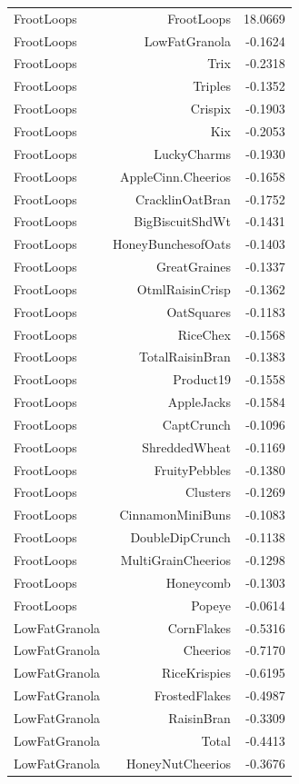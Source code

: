 \begin{longtable}{@{}lrr@{}}
FrootLoops & FrootLoops & 18.0669 \\
FrootLoops & LowFatGranola & -0.1624 \\
FrootLoops & Trix & -0.2318 \\
FrootLoops & Triples & -0.1352 \\
FrootLoops & Crispix & -0.1903 \\
FrootLoops & Kix & -0.2053 \\
FrootLoops & LuckyCharms & -0.1930 \\
FrootLoops & AppleCinn.Cheerios & -0.1658 \\
FrootLoops & CracklinOatBran & -0.1752 \\
FrootLoops & BigBiscuitShdWt & -0.1431 \\
FrootLoops & HoneyBunchesofOats & -0.1403 \\
FrootLoops & GreatGraines & -0.1337 \\
FrootLoops & OtmlRaisinCrisp & -0.1362 \\
FrootLoops & OatSquares & -0.1183 \\
FrootLoops & RiceChex & -0.1568 \\
FrootLoops & TotalRaisinBran & -0.1383 \\
FrootLoops & Product19 & -0.1558 \\
FrootLoops & AppleJacks & -0.1584 \\
FrootLoops & CaptCrunch & -0.1096 \\
FrootLoops & ShreddedWheat & -0.1169 \\
FrootLoops & FruityPebbles & -0.1380 \\
FrootLoops & Clusters & -0.1269 \\
FrootLoops & CinnamonMiniBuns & -0.1083 \\
FrootLoops & DoubleDipCrunch & -0.1138 \\
FrootLoops & MultiGrainCheerios & -0.1298 \\
FrootLoops & Honeycomb & -0.1303 \\
FrootLoops & Popeye & -0.0614 \\
LowFatGranola & CornFlakes & -0.5316 \\
LowFatGranola & Cheerios & -0.7170 \\
LowFatGranola & RiceKrispies & -0.6195 \\
LowFatGranola & FrostedFlakes & -0.4987 \\
LowFatGranola & RaisinBran & -0.3309 \\
LowFatGranola & Total & -0.4413 \\
LowFatGranola & HoneyNutCheerios & -0.3676 \\

\end{longtable}
